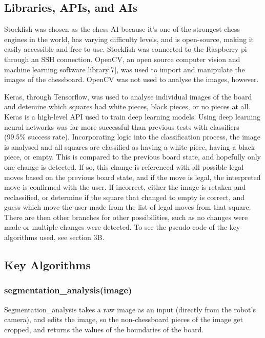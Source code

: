 \documentclass[onecolumn]{IEEEtran}
\begin{document}
\subsection{Libraries, APIs, and AIs}
Stockfish was chosen as the chess AI because it's one of the strongest chess engines in the world, has varying difficulty levels, and is open-source, making it easily accessible and free to use. Stockfish was connected to the Raspberry pi through an SSH connection. OpenCV, an open source computer vision and machine learning software library[7], was used to import and manipulate the images of the chessboard. OpenCV was not used to analyse the images, however.\par 
Keras, through Tensorflow, was used to analyse individual images of the board and detemine which squares had white pieces, black pieces, or no pieces at all. Keras is a high-level API used to train deep learning models. Using deep learning neural networks was far more successful than previous tests with classifiers (99.5\% success rate). Incorporating logic into the classification process, the image is analysed and all squares are classified as having a white piece, having a black piece, or empty. This is compared to the previous board state, and hopefully only one change is detected. If so, this change is referenced with all possible legal moves based on the previous board state, and if the move is legal, the interpreted move is confirmed with the user. If incorrect, either the image is retaken and reclassified, or determine if the square that changed to empty is correct, and guess which move the user made from the list of legal moves from that square. There are then other branches for other possibilities, such as no changes were made or multiple changes were detected. To see the pseudo-code of the key algorithms used, see section 3B. 


\subsection{Key Algorithms}
\subsubsection{segmentation\_analysis(image)}
Segmentation\_analysis takes a raw image as an input (directly from the robot's camera), and edits the image, so the non-chessboard pieces of the image get cropped, and returns the values of the boundaries of the board.
\end{document}
